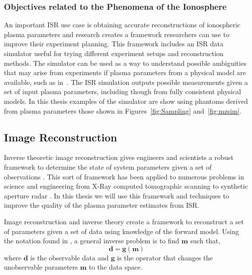 
\subsubsection{Objectives related to the Phenomena of the Ionosphere}
An important ISR use case is obtaining accurate reconstructions of ionospheric plasma parameters and research creates a framework researchers can use to improve their experiment planning. This framework includes an ISR data simulator useful for trying different experiment setups and reconstruction methods. The simulator can be used as a way to understand possible ambiguities that may arise from experiments if plasma parameters from a physical model are available, such as in~\cite{Perry:2015jf}. The ISR simulation outputs possible measurements given a set of input plasma parameters, including though from fully consistent physical models. In this thesis examples of the simulator are show using phantoms derived from plasma parameters those shown in Figures~\ref{fig:Sampling} and~\ref{fig:mzsim}. 


\subsection{Image Reconstruction}
\label{sec:imgrec}
Inverse theoretic image reconstruction gives engineers and scientists a robust framework to determine the state of system parameters given a set of observations \cite{menke2012geophysical,Vogel:2002:CMI:581830,Karl:2005jy}. This sort of framework has been applied to numerous problems in science and engineering from X-Ray computed tomographic scanning \cite{kak1988principles} to synthetic aperture radar \cite{1456966}. In this thesis we will use this framework and techniques to improve the quality of the plasma parameter estimates from ISR.

Image reconstruction and inverse theory create a framework to reconstruct a set of parameters given a set of data using knowledge of the forward model. Using the notation found in \cite{menke2012geophysical}, a general inverse problem is to find $\mathbf{m}$ such that,
\begin{equation}
\label{eqn:invprob}
\mathbf{d}=\mathbf{g}(\mathbf{m})
\end{equation}
where $\mathbf{d}$ is the observable data and $\mathbf{g}$ is the operator that changes the unobservable parameters $\mathbf{m}$ to the data space. 


